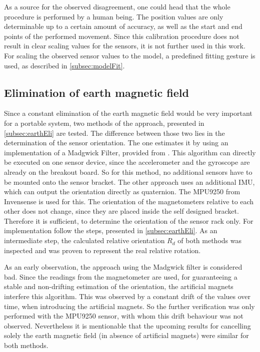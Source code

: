 As a source for the observed disagreement, one could head that the whole procedure is performed by a human being. The position values are only determinable up to a certain amount of accuracy, as well as the start and end points of the performed movement. Since this calibration procedure does not result in clear scaling values for the sensors, it is not further used in this work. For scaling the observed sensor values to the model, a predefined fitting gesture is used, as described in \ref{subsec:modelFit}.  


\subsection{Elimination of earth magnetic field} \label{subsec:resEarthEli}

Since a constant elimination of the earth magnetic field would be very important for a portable system, two methods of the approach, presented in \ref{subsec:earthEli} are tested. The difference between those two lies in the determination of the sensor orientation. The one estimates it by using an implementation of a Madgwick Filter, provided from \cite{mikeshub2012}. This algorithm can directly be executed on one sensor device, since the accelerometer and the gyroscope are already on the breakout board. So for this method, no additional sensors have to be mounted onto the sensor bracket. The other approach uses an additional \ac{IMU}, which can output the orientation directly as quaternion. The MPU9250 from Invensense \cite{MPU2014} is used for this. The orientation of the magnetometers relative to each other does not change, since they are placed inside the self designed bracket. Therefore it is sufficient, to determine the orientation of the sensor rack only. For implementation follow the steps, presented in \ref{subsec:earthEli}. As an intermediate step, the calculated relative orientation $ R_{d} $ of both methods was inspected and was proven to represent the real relative rotation.

As an early observation, the approach using the Madgwick filter is considered bad. Since the readings from the magnetometer are used, for guaranteeing a stable and non-drifting estimation of the orientation, the artificial magnets interfere this algorithm. This was observed by a constant drift of the values over time, when introducing the artificial magnets. So the further verification was only performed with the MPU9250 sensor, with whom this drift behaviour was not observed. Nevertheless it is mentionable that the upcoming results for cancelling solely the earth magnetic field (in absence of artificial magnets) were similar for both methods.

